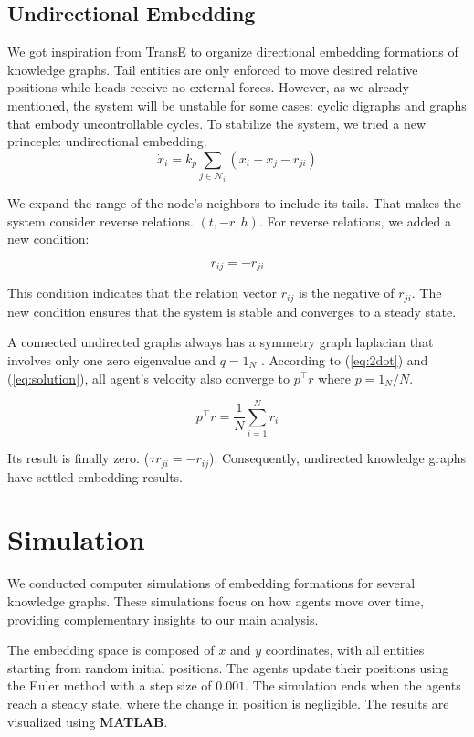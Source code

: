 \documentclass[letterpaper, 10 pt, conference]{ieeeconf}  %
\begin{document}
\subsection{Undirectional Embedding} 
We got inspiration from TransE to organize directional embedding formations of knowledge graphs. Tail entities are only enforced to move desired relative positions while heads receive no external forces. However, as we already mentioned, the system will be unstable for some cases: cyclic digraphs and graphs that embody uncontrollable cycles. To stabilize the system, we tried a new princeple: undirectional embedding.
\begin{equation}
    \dot{x}_i = k_p \sum_{j \in \mathcal{N}_i} (x_i - x_j - r_{ji})
\end{equation}

We expand the range of the node's neighbors to include its tails. That makes the system consider reverse relations. \( (t, -r, h) \). For reverse relations, we added a new condition: 

\[ r_{ij} = -r_{ji} \]

\noindent This condition indicates that the relation vector \( r_{ij} \) is the negative of \( r_{ji} \). The new condition ensures that the system is stable and converges to a steady state.

A connected undirected graphs always has a symmetry graph laplacian that involves only one zero eigenvalue and \( q = 1_N \) \cite{olfati-saber_consensus_2007}. According to (\ref{eq:2dot}) and (\ref{eq:solution}), all agent's velocity also converge to \(p^\top r\) where \(p = 1_N / N \). 

\[
p^\top r = \frac{1}{N} \sum_{i = 1}^N r_i
\]

\noindent Its result is finally zero. (\(\because r_{ji} = -r_{ij}\)). Consequently, undirected knowledge graphs have settled embedding results. 

\section{Simulation}
We conducted computer simulations of embedding formations for several knowledge graphs. These simulations focus on how agents move over time, providing complementary insights to our main analysis.

The embedding space is composed of \(x\) and \(y\) coordinates, with all entities starting from random initial positions. The agents update their positions using the Euler method with a step size of \(0.001\). The simulation ends when the agents reach a steady state, where the change in position is negligible. The results are visualized using \textbf{MATLAB}.
\end{document}
